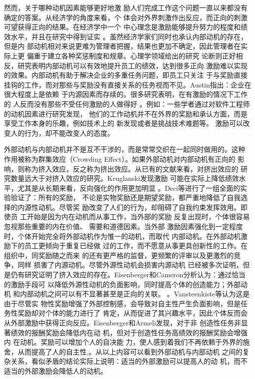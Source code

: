 \documentclass[12pt,a4paper]{ctexart}
\begin{document}
然而，关于哪种动机因素能够更好地激
励人们完成工作这个问题一直以来都没有确定的答案。从经济学的角度来看，个
体会对外界刺激作出反应，而正向的刺激可望获得正向的结果。在经济学中一个
中心理念是激励能够提升努力的程度和绩效水平，并且在研究中得到证实
\cite{388530120001201}。虽然经济学家们同时也承认内部动机的存在，但是内
部动机相对来说更难为管理者把握，结果也更加不确定，因此管理者在实际上更
偏重于建立各种奖惩制度和规章\cite{argyris1998ee}。心理学领域给出的研究
论断则正好相反，研究表明内部动机可以有效地提升员工的绩效，达到很多正向
激励难以实现的效果。内部动机有助于解决企业的多重任务问题\cite{gibbons1998io}\cite{holmstrom1991mpa}\cite{prendergast1999pif}，即员工只关注
于与奖励直接挂钩的工作，而对那些与奖励没有直接关系的任务视而不见。Austin指出：企业在很大程度上是依赖
于内源因素而存续的\cite{austin1996mam}。很多研究表明，在有激励的情况下工作的
人反而没有那些不受任何激励的人做得好
\cite{Deci1975}\cite{wilson1981aas}\cite{kruglanski1971eei}\cite{lepper1973ucs}
。例如：一些学者通过对软件工程师的动机因素进行研究发现，
他们的工作动机并不在外界的奖励和承认方面，而是享受工作本身的乐趣，例如技术上的
新发现或者是挑战技术难题等\cite{1252263}\cite{1125221}。
激励可以改变人的行为，却不能改变人的态度。


外部动机与内部动机并不是互不干涉的，而是常常交织在一起同时做用的。这种
作用被称为群集效应（Crowding Effect）。如果外部动机对内部动机有正向的
影响，则称为挤入效应，反之称为挤出效应。从已有的文献来看，对挤出效应的
研究数量远大于对挤入效应的研究。Kruglanski发现激励
可能在实际上降低绩效水平，尤其是从长期来看，反向强化的作用更加明显
\cite{Kruglanski1978}。Deci等进行了一组全面的实验验证了：所有的奖励，
不论是实物奖励还是期望奖励，都严重地降低了自我选择的内源性动机。尽管奖
励改变了人们的行为，却阻碍了自我约束发挥效用\cite{deci1999mar}。即使员
工开始是因为内在动机而从事工作，当外部的奖励
反复出现时，个体很容易忽视那些重要的内在价值、
需要和道德因素\cite{deci2000agp}。当外部
激励因素强化到一定程度时，个体开始完全将外部动机作为惟一的动机，而取代
内部动机\cite{kasser2002hpm}。在外部动机激励下的员工更倾向于重复已经做
过的工作，而不愿意从事更具创新性的工作\cite{amabile1998kc}\cite{schwartz1993cad}。在组织中，同奖励随之而来
的还有更严格的监督，更频繁的评审以及更激烈的竞争\cite{Kohn1993}，同样
损害了内源动机\cite{deci1985ima}。尽管外源性动机会损害内源动机
已经被多次证明，但是仍有研究证明了挤入效应的存在。Eisenberger和Cameron分析认为：通过恰当的激励手段可
以降低外源性动机的负面影响，同时提高个体的创造能力；外部动机
和内部动机之间可以有不显著甚至是正向的关联。
\cite{eisenberger1996der}。Vansteenkiste等认为这是由于尽管实
物性奖励增强了外部控制感，会导致对自主性产生负面影响，但是任务性奖励却对个体的能力进行了
肯定，从而促进了其兴趣水平，因此个体反而会从外部激励中获得正向反应\cite{vansteenkiste2003ccr}。Eisenberger和Armeli发现，对于非
创造性任务非显著绩效的报酬奖励会降低内在动
机，但对于创造性任务高绩效的报酬奖励会增强内
在动机\cite{eisenberger1997csr}。奖励可以增加个人的自决能
力，使人感到着我们不再依赖于外界的施舍，从而提高了人的自主性\cite{eisenberger1999dpp},\cite{eisenberger1999eri}。从以上内容可以看到外部动机与内部动机
之间的复杂关系，看似矛盾的结论实际上说明：适当的外部激励可以提高人的动
机，而不适当的外部激励会降低人的动机。
\end{document}

